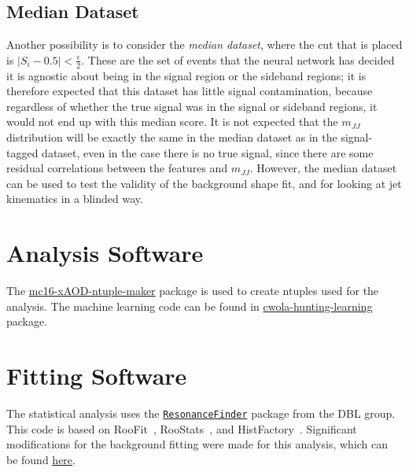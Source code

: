 \subsection{Median Dataset}
Another possibility is to consider the \textit{median dataset}, where the cut that is placed is $|S_i-0.5|<\frac{\epsilon}{2}$.
These are the set of events that the neural network has decided it is agnostic about being in the signal region or the sideband regions; it is therefore expected that this dataset has little signal contamination, because regardless of whether the true signal was in the signal or sideband regions, it would not end up with this median score.
It is not expected that the $m_{JJ}$ distribution will be exactly the same in the median dataset as in the signal-tagged dataset, even in the case there is no true signal, since there are some residual correlations between the features and $m_{JJ}$.
However, the median dataset can be used to test the validity of the background shape fit, and for looking at jet kinematics in a blinded way.

\section{Analysis Software}
\label{app:CWoLa:software}

The \href{https://gitlab.cern.ch/acukierm/mc16-xAOD-ntuple-maker}{mc16-xAOD-ntuple-maker} package is used to create ntuples used for the analysis.
The machine learning code can be found in \href{https://gitlab.cern.ch/cwola-hunting/cwola-hunting-learning}{cwola-hunting-learning} package.

\section{Fitting Software}
\label{app:CWoLa:fitting_software}
The statistical analysis uses the \href{https://gitlab.cern.ch/atlas-phys/exot/dbl/ResonanceFinder}{\texttt{ResonanceFinder}} package from the DBL group.
This code is based on RooFit~\cite{Verkerke:2003ir}, RooStats~\cite{Moneta:2010pm}, and HistFactory~\cite{Cranmer:1456844}.
Significant modifications for the background fitting were made for this analysis, which can be found \href{https://gitlab.cern.ch/cwola-hunting/fitting/tree/minimal}{here}.


